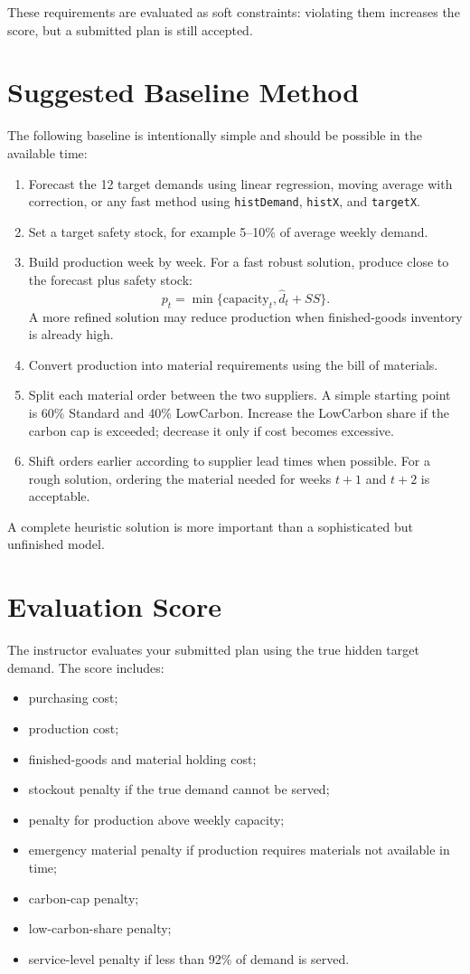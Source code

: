 \documentclass[11pt,a4paper]{article}
\begin{document}
These requirements are evaluated as soft constraints: violating them increases the score, but a submitted plan is still accepted.

\section*{Suggested Baseline Method}
The following baseline is intentionally simple and should be possible in the available time:
\begin{enumerate}
    \item Forecast the 12 target demands using linear regression, moving average with correction, or any fast method using \texttt{histDemand}, \texttt{histX}, and \texttt{targetX}.
    \item Set a target safety stock, for example 5--10\% of average weekly demand.
    \item Build production week by week. For a fast robust solution, produce close to the forecast plus safety stock:
    \begin{equation}
    p_t = \min\{\mathrm{capacity}_t,\widehat d_t + SS\}.
    \end{equation}
    A more refined solution may reduce production when finished-goods inventory is already high.
    \item Convert production into material requirements using the bill of materials.
    \item Split each material order between the two suppliers. A simple starting point is 60\% Standard and 40\% LowCarbon. Increase the LowCarbon share if the carbon cap is exceeded; decrease it only if cost becomes excessive.
    \item Shift orders earlier according to supplier lead times when possible. For a rough solution, ordering the material needed for weeks $t+1$ and $t+2$ is acceptable.
\end{enumerate}

A complete heuristic solution is more important than a sophisticated but unfinished model.

\section*{Evaluation Score}
The instructor evaluates your submitted plan using the true hidden target demand. The score includes:
\begin{itemize}
    \item purchasing cost;
    \item production cost;
    \item finished-goods and material holding cost;
    \item stockout penalty if the true demand cannot be served;
    \item penalty for production above weekly capacity;
    \item emergency material penalty if production requires materials not available in time;
    \item carbon-cap penalty;
    \item low-carbon-share penalty;
    \item service-level penalty if less than 92\% of demand is served.
\end{itemize}
\end{document}
